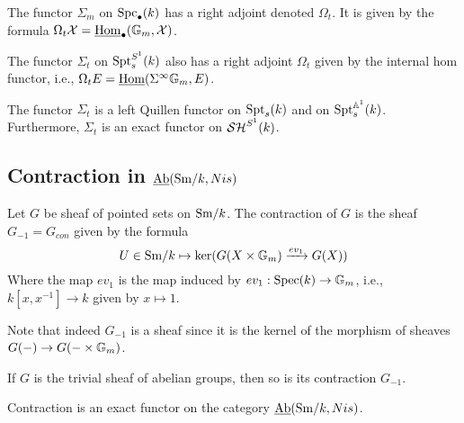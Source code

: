 \documentclass{amsart}%
\begin{document}
\begin{definition}
  The functor $\Sigma_m$ on $\mathrm{Spc}_{\bullet}(k)$ has a right adjoint
  denoted $\Omega_t$. It is given by the formula
  $\Omega_t\mathcal{X} = \underline{\operatorname{Hom}}_{\bullet}(\mathbb{G}_m,\mathcal{X})$.

  The functor $\Sigma_t$ on $\mathrm{Spt}_s^{S^1}(k)$ also has a right adjoint
  $\Omega_t$ given by the internal hom functor, i.e.,
  $\Omega_tE = \underline{\operatorname{Hom}}(\Sigma^{\infty}\mathbb{G}_{m}, E)$.
\end{definition}

\begin{proposition}
  The functor $\Sigma_t$ is a left Quillen functor on $\mathrm{Spt}_s(k)$ and
  on $\mathrm{Spt}_s^{\mathbb{A}^1}(k)$. Furthermore, $\Sigma_t$ is an exact functor
  on $\mathcal{SH}^{S^1}(k)$. 
\end{proposition}

\subsection{Contraction in $\operatorname{\underline{Ab}}(\mathrm{Sm}/k,Nis)$}

\begin{definition}
  Let $G$ be sheaf of pointed sets on $\mathrm{Sm}/k$. The contraction of $G$
  is the sheaf $G_{-1}=G_{con}$ given by the formula 
  \begin{equation*}
    U \in \mathrm{Sm}/k \mapsto \ker( G(X\times \mathbb{G}_m) \xrightarrow{ev_1} G(X))
  \end{equation*}
  Where the map $ev_1$ is the map induced by
  $ev_1 : \operatorname{Spec}(k) \to \mathbb{G}_m$, i.e., $k[x,x^{-1}] \to k$ given by
  $x\mapsto 1$. 

  Note that indeed $G_{-1}$ is a sheaf since it is the kernel of the
  morphism of sheaves $G(-) \to G(-\times \mathbb{G}_m)$. 
\end{definition}

\begin{proposition}
  If $G$ is the trivial sheaf of abelian groups, then so is its
  contraction $G_{-1}$.
\end{proposition}

\begin{proposition}
  Contraction is an exact functor on the category $\operatorname{\underline{Ab}}(\mathrm{Sm}/k,Nis)$.
\end{proposition}
\end{document}
